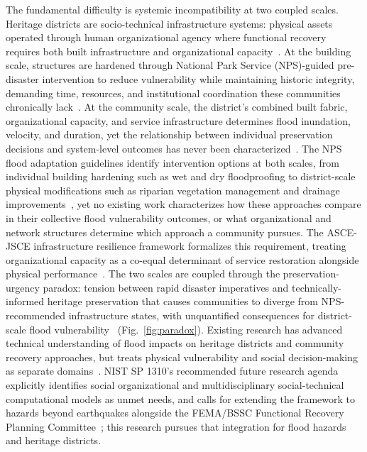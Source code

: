 \documentclass[11pt]{article}
\begin{document}
The fundamental difficulty is systemic incompatibility at two coupled scales.
Heritage districts are socio-technical infrastructure systems: physical assets operated
through human organizational agency where functional recovery requires both built
infrastructure and organizational capacity~\cite{NIST2024SP1310}.
At the building scale, structures are hardened through National Park Service (NPS)-guided
pre-disaster intervention to reduce vulnerability while maintaining historic integrity,
demanding time, resources, and institutional coordination these communities chronically
lack~\cite{NPS2021,SeronSuhoothi2017,Jigyasu2024,joshi2021community}.
At the community scale, the district's combined built fabric, organizational capacity,
and service infrastructure determines flood inundation, velocity, and duration, yet
the relationship between individual preservation decisions and system-level outcomes
has never been characterized~\cite{NIST2024SP1310,vojinovic2016holistic}.
The NPS flood adaptation guidelines identify intervention options at both scales,
from individual building hardening such as wet and dry floodproofing to district-scale
physical modifications such as riparian vegetation management and drainage
improvements~\cite{NPS2021}, yet no existing work characterizes how these approaches
compare in their collective flood vulnerability outcomes, or what organizational and
network structures determine which approach a community pursues.
The ASCE-JSCE infrastructure resilience framework formalizes this requirement,
treating organizational capacity as a co-equal determinant of service restoration
alongside physical performance~\cite{davis2023}.
The two scales are coupled through the preservation-urgency paradox: tension between
rapid disaster imperatives and technically-informed heritage preservation that causes
communities to diverge from NPS-recommended infrastructure states, with unquantified
consequences for district-scale flood
vulnerability~\cite{maalouf2025a,maalouf2025b} (Fig.~\ref{fig:paradox}).
Existing research has advanced technical understanding of flood impacts on heritage
districts and community recovery approaches, but treats physical vulnerability and
social decision-making as separate
domains~\cite{sesana2021climate,NPS2021,Arrighi2024,castro2021community,gibson2019engagement,briz2022prioritization,fatoric2023towards,kim2021implementation}.
NIST SP 1310's recommended future research agenda explicitly identifies social
organizational and multidisciplinary social-technical computational models as unmet
needs, and calls for extending the framework to hazards beyond earthquakes alongside
the FEMA/BSSC Functional Recovery Planning
Committee~\cite{NIST2024SP1310,NIBSFunctionalRecovery2023}; this research pursues
that integration for flood hazards and heritage districts.
\end{document}
